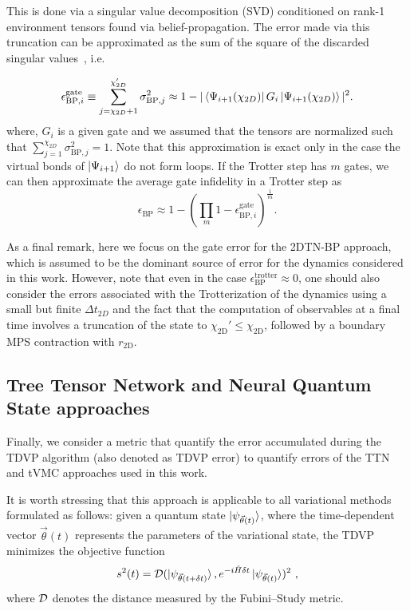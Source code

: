 \documentclass[aps,pra,reprint,amssymb,superscriptaddress]{revtex4-2}
\begin{document}
This is done via a singular value decomposition (SVD) conditioned on rank-1 environment tensors found via belief-propagation. The error made via this truncation can be approximated as the sum of the square of the discarded singular values~\cite{rudolph_simulating_2025}, i.e. 

\begin{equation}
\epsilon_{\text{BP},i}^{\text{gate}}\equiv \sum_{j=\chi_{2D}+1}^{\chi_{2D}'} \sigma^2_{\text{BP}, j}\approx 1-|\bra{\Psi_{i+1}(\chi_{2D})}G_i\ket{\Psi_{i+1}(\chi_{2D})}|^2.
\end{equation}
where, $G_i$ is a given gate and we assumed that the tensors are normalized such that $\sum_{j=1}^{\chi_{2D}} \sigma^2_{\text{BP}, j}=1$. Note that this approximation is exact only in the case the virtual bonds of $\ket{\Psi_{i+1}}$ do not form loops. If the Trotter step has $m$ gates, we can then approximate the average gate infidelity in a Trotter step as~\cite{zhou_what_2020, rudolph_simulating_2025}
\begin{equation}
    \epsilon_{\text{BP}}\approx 1-\left(\prod_m 1-\epsilon_{\text{BP},i}^{\text{gate}}\right)^{\frac{1}{m}}.
\end{equation}

As a final remark, here we focus on the gate error for the 2DTN-BP approach, which is assumed to be the dominant source of error for the dynamics considered in this work. However, note that even in the case $\epsilon^{\text{trotter}}_\text{BP}\approx 0$, one should also consider the errors associated with the Trotterization of the dynamics using a small but finite $\Delta t_{2D}$ and the fact that the computation of observables at a final time involves a truncation of the state to $\chi_\text{2D}'\leq \chi_\text{2D}$, followed by a boundary MPS contraction with $r_\text{2D}$.


\subsection{Tree Tensor Network and Neural Quantum State approaches}
 
Finally,  we consider a metric that quantify  the error accumulated during the TDVP algorithm (also denoted as TDVP error) to quantify errors of the TTN and tVMC approaches used in this work.

It is worth stressing that this approach is applicable to all variational methods formulated as follows:
given a quantum state $\ket{\psi_{\vec{\theta}(t)}}$, where the time-dependent vector $\vec{\theta}(t)$
represents the parameters of the variational state, the TDVP minimizes the objective function
%
\begin{equation}
s^2(t) = {\cal{D}}(\ket{\psi_{\vec{\theta}(t + \delta t)}},
e^{-i\hat H \delta t}\ket{\psi_{\vec{\theta}(t)}})^2\ ,
\label{eq:tdvp_err}
\end{equation}
%
where ${\cal{D}}$ denotes the distance measured by the Fubini–Study metric.
\end{document}
